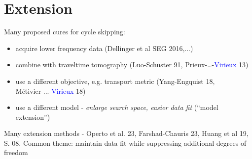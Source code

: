 \documentclass[xcolor=dvipsnames,12pt,aspectratio=169]{beamer}
\begin{document}

\section{Extension}
\begin{frame}
  Many proposed cures for cycle skipping:
  \begin{itemize}
  \item acquire lower frequency data (Dellinger et al SEG 2016,...) 
  \item combine with traveltime tomography (Luo-Schuster 91,
    Prieux-\ldots-\textcolor{blue}{Virieux} 13)
  \item use a different objective, e.g. transport metric
    (Yang-Engquist 18, M\'{e}tivier-...-\textcolor{blue}{Virieux} 18)
  \item use a different model - {\em enlarge search space, easier data
    fit} (``model extension'')
  \end{itemize}

Many extension methods - Operto et al. 23, Farshad-Chauris 23, Huang
et al 19, S. 08. Common theme: maintain data fit while suppressing
additional degrees of freedom
\end{frame}
\end{document}
